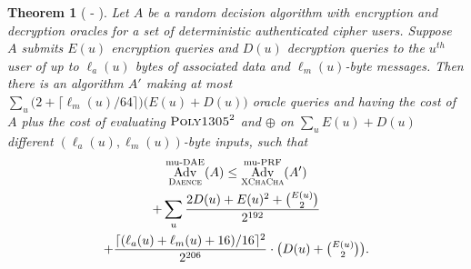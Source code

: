 \documentclass[draft]{article}
\newtheorem{theorem}{Theorem}
\def\operatorsc#1{{%
  \ifmmode\let\next=\operatorname\else\let\next=\relax\fi\next{\textsc{#1}}}}
\def\ChaCha#1/{\operatorsc{ChaCha#1}}
\def\XChaCha#1/{\operatorsc{XChaCha#1}}
\def\Poly#1/{\operatorsc{Poly#1}}
\def\Daence/{\operatorsc{Daence}}
\def\muPRF{%
  \ifmmode\def\next{\operatorname{mu-PRF}}%
    \else\def\next/{mu-\textsc{prf}}%
  \fi\next}
\def\muDAE{%
  \ifmmode\def\next{\operatorname{mu-DAE}}%
    \else\def\next/{mu-\textsc{dae}}%
  \fi\next}
\DeclareMathOperator{\Adv}{Adv}
\begin{document}
\begin{theorem}[\ChaCha/-\Daence/]\label{thm-chacha-daence}
  Let $A$ be a random decision algorithm with encryption and
   decryption oracles for a set of deterministic authenticated
   cipher users.
  Suppose $A$ submits $E(u)$ encryption queries and $D(u)$ decryption
   queries to the $u^{\mathit{th}}$ user of up to $\ell_a(u)$ bytes of
   associated data and $\ell_m(u)$-byte messages.
  Then there is an algorithm $A'$ making at most
   $\sum_u \bigl(2 + \lceil\ell_m(u)/64\rceil\bigr)
     \bigl(E(u) + D(u)\bigr)$
   oracle queries and having the cost of $A$ plus the cost of
   evaluating $\Poly1305/^2$ and $\oplus$ on
   $\sum_u E(u) + D(u)$
   different $(\ell_a(u), \ell_m(u))$-byte inputs,
   such that
%
  \begin{multline*}
    \Adv^{\muDAE}_{\Daence/}(A)
     \leq \Adv^{\muPRF}_{\XChaCha/}(A') \\
            + \sum_u
                \frac{2 D(u) + E(u)^2 + \binom{E(u)}{2}}
                     {2^{192}} \\
                + \frac{\lceil(\ell_a(u) + \ell_m(u) + 16)/16\rceil^2}{2^{206}}
                  \cdot
                  {\textstyle\bigl(D(u) + \binom{E(u)}{2}\bigr)}.
  \end{multline*}
\end{theorem}



\end{document}
